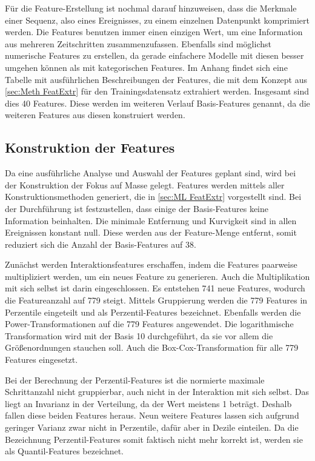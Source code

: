 Für die Feature-Erstellung ist nochmal darauf hinzuweisen, dass die Merkmale einer Sequenz, also eines Ereignisses, zu einem einzelnen Datenpunkt komprimiert werden. Die Features benutzen immer einen einzigen Wert, um eine Information aus mehreren Zeitschritten zusammenzufassen. Ebenfalls sind möglichst numerische Features zu erstellen, da gerade einfachere Modelle mit diesen besser umgehen können als mit kategorischen Features. Im Anhang findet sich eine Tabelle mit ausführlichen Beschreibungen der Features, die mit dem Konzept aus \autoref{sec:Meth FeatExtr} für den Trainingsdatensatz extrahiert werden. Insgesamt sind dies 40 Features. Diese werden im weiteren Verlauf Basis-Features genannt, da die weiteren Features aus diesen konstruiert werden.\par


\subsection{Konstruktion der Features} \label{sec:Meth KonstrFeatures}
Da eine ausführliche Analyse und Auswahl der Features geplant sind, wird bei der Konstruktion der Fokus auf Masse gelegt. Features werden mittels aller Konstruktionsmethoden generiert, die in \autoref{sec:ML FeatExtr} vorgestellt sind. Bei der Durchführung ist festzustellen, dass einige der Basis-Features keine Information beinhalten. Die minimale Entfernung und Kurvigkeit sind in allen Ereignissen konstant null. Diese werden aus der Feature-Menge entfernt, somit reduziert sich die Anzahl der Basis-Features auf 38.\par

Zunächst werden Interaktionsfeatures erschaffen, indem die Features paarweise multipliziert werden, um ein neues Feature zu generieren. Auch die Multiplikation mit sich selbst ist darin eingeschlossen. Es entstehen 741 neue Features, wodurch die Featureanzahl auf 779 steigt. Mittels Gruppierung werden die 779 Features in Perzentile eingeteilt und als Perzentil-Features bezeichnet. Ebenfalls werden die Power-Transformationen auf die 779 Features angewendet. Die logarithmische Transformation wird mit der Basis 10 durchgeführt, da sie vor allem die Größenordnungen stauchen soll. Auch die Box-Cox-Transformation für alle 779 Features eingesetzt. \par

Bei der Berechnung der Perzentil-Features ist die normierte maximale Schrittanzahl nicht gruppierbar, auch nicht in der Interaktion mit sich selbst. Das liegt an Invarianz in der Verteilung, da der Wert meistens 1 beträgt. Deshalb fallen diese beiden Features heraus. Neun weitere Features lassen sich aufgrund geringer Varianz zwar nicht in Perzentile, dafür aber in Dezile einteilen. Da die Bezeichnung Perzentil-Features somit faktisch nicht mehr korrekt ist, werden sie als Quantil-Features bezeichnet. \par

